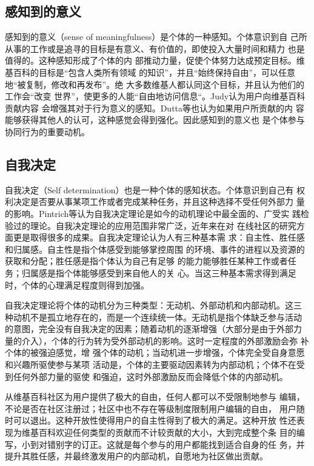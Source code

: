 \subsection{感知到的意义}
\label{sec:sense-of-meaning}

感知到的意义（sense of meaningfulness）是个体的一种感知。个体意识到自
己所从事的工作或是追寻的目标是有意义、有价值的，即使投入大量时间和精力
也是值得的。这种感知形成了个体的内
部推动力量，促使个体努力达成预定目标。维基百科的目标是“包含人类所有领域
的知识”，并且“始终保持自由”，可以任意地“被复制，修改和再发布”。绝
大多数维基人都认同这个目标，并且认为他们的工作会“改变
世界”，使更多的人能“自由地访问信息“。Judy认为用户向维基百科贡献内容
会增强其对于行为意义的感知\cite{citeulike:3063318}。Dutta等也认为如果用户所贡献的内
容能够获得其他人的认可，这种感觉会得到强化\cite{dutta2008wikipedia}。因此感知到的意义也
是个体参与协同行为的重要动机。

\subsection{自我决定}
\label{sec:self-determination}

自我决定（Self determination）也是一种个体的感知状态。个体意识到自己有
权利决定是否要从事某项工作或者完成某种任务，并且这种选择不受任何外部力
量的影响。Pintrich等认为自我决定理论是如今的动机理论中最全面的、广受实
践检验过的理论。自我决定理论的应用范围非常广泛，近年来在对
在线社区的研究方面更是取得很多的成果。自我决定理论认为人有三种基本需
求：自主性、胜任感和归属感。自主性是指个体感受到能够掌控周围
的环境、事件的进程以及资源的获取和分配；胜任感是指个体认为自己有足够
的能力能够胜任某种工作或者任务；归属感是指个体能够感受到来自他人的关
心。当这三种基本需求得到满足时，个体的心理满足程度则得到加强。

自我决定理论将个体的动机分为三种类型：无动机、外部动机和内部动机。这三
种动机不是孤立地存在的，而是一个连续统一体。无动机是指个体缺乏参与活动
的意图，完全没有自我决定的因素；随着动机的逐渐增强（大部分是由于外部力
量的介入），个体的行为转为受外部动机的影响。这时一定程度的外部激励会弥
补个体的被强迫感觉，增
强个体的动机；当动机进一步增强，个体完全受自身意愿和兴趣所驱使参与某项
活动是，个体的主要驱动因素转为内部动机；个体不在受到任何外部力量的驱使
和强迫，这时外部激励反而会降低个体的内部动机。

从维基百科社区为用户提供了极大的自由，任何人都可以不受限制地参与
编辑，不论是否在社区注册过；社区中也不存在等级制度限制用户编辑的自由，
用户随时可以退出。这种开放性使得用户的自主性得到了极大的满足。这种开放
性还表现为维基百科欢迎任何类型的贡献而不计较贡献的大小，大到完成整个条
目的编写，小到对错别字的订正。这就是每个参与的用户都能找到适合自身的任
务，并提升其胜任感，并最终激发用户的内部动机，自愿地为社区做出贡献。

